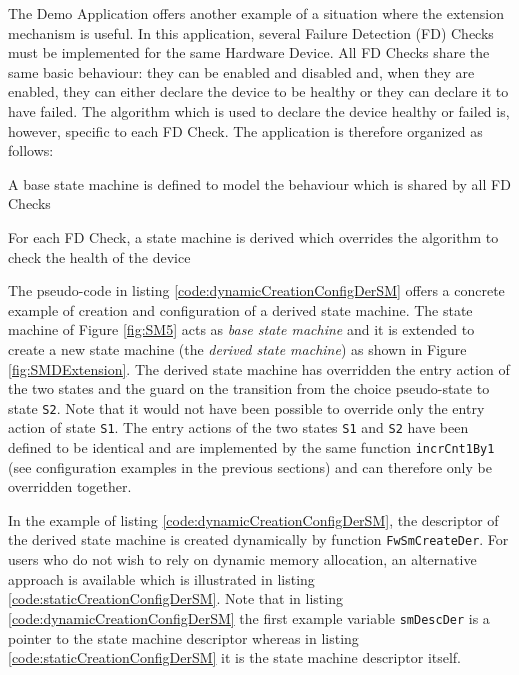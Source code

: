 \documentclass[a4paper,10pt]{article}
\newenvironment{fw_itemize}						%
{\begin{itemize}
  \setlength{\itemsep}{1mm}
  \setlength{\parskip}{0pt}
  \setlength{\parsep}{0pt}}
{\end{itemize}}
\begin{document}
The Demo Application offers another example of a situation where the extension mechanism is useful. In this 
application, several Failure Detection (FD) Checks must be implemented for the same Hardware Device. All FD 
Checks share the same basic behaviour: they can be enabled and disabled and, when they are enabled, they can 
either declare the device to be healthy or they can declare it to have failed. The algorithm which is used to 
declare the device healthy or failed is, however, specific to each FD Check. The application is therefore organized 
as follows:

\begin{fw_itemize}
\item A base state machine is defined to model the behaviour which is shared by all FD Checks
\item For each FD Check, a state machine is derived which overrides the algorithm to check the health of the device
\end{fw_itemize}

The pseudo-code in listing \ref{code:dynamicCreationConfigDerSM} offers a concrete example of creation and 
configuration of a derived state machine. 
The state machine of Figure \ref{fig:SM5} acts as \emph{base state machine} and it is extended to create a new state 
machine (the \emph{derived state machine}) as shown in Figure \ref{fig:SMDExtension}. The derived state machine has 
overridden the entry action of the two states and the guard on the transition from the choice pseudo-state to state 
\texttt{S2}. Note that it would not have been possible to override only the entry action of state \texttt{S1}. The entry actions 
of the two states \texttt{S1} and \texttt{S2} have been defined to be identical and are implemented by the same function 
\texttt{incrCnt1By1} (see configuration examples in the previous sections) and can therefore only be overridden together. 

In the example of listing \ref{code:dynamicCreationConfigDerSM}, the descriptor of the derived state machine is created dynamically by 
function \texttt{FwSmCreateDer}. For users who do not wish to rely on dynamic memory allocation, an alternative approach 
is available which is illustrated in listing \ref{code:staticCreationConfigDerSM}. 
Note that in listing \ref{code:dynamicCreationConfigDerSM} the first example variable \texttt{smDescDer} is 
a pointer to the state machine descriptor whereas in listing \ref{code:staticCreationConfigDerSM} it is the state machine descriptor itself.
\end{document}
